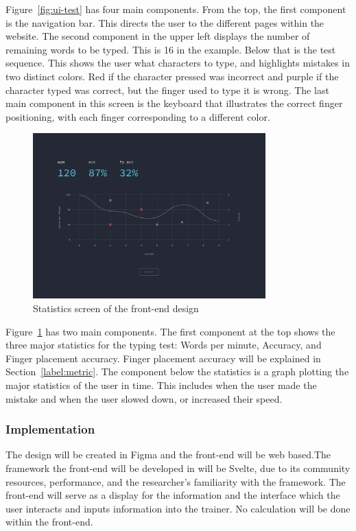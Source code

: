 \documentclass{report}
\begin{document}
Figure~\ref{fig:ui-test} has four main components. From the top, the first
component is the navigation bar. This directs the user to the different pages
within the website. The second component in the upper left displays the number
of remaining words to be typed. This is 16 in the example. Below that is the
test sequence. This shows the user what characters to type, and highlights
mistakes in two distinct colors. Red if the character pressed was incorrect and
purple if the character typed was correct, but the finger used to type it is
wrong. The last main component in this screen is the keyboard that illustrates
the correct finger positioning, with each finger corresponding to a different
color.

\begin{figure}[H]
	\centering
	\includegraphics[width=0.8\textwidth]{ui-stats.png}
	\caption{Statistics screen of the front-end design}
	\label{fig:ui-stat}
	\centering
\end{figure}

Figure~\ref{fig:ui-stat} has two main components. The first component at the top
shows the three major statistics for the typing test: Words per minute,
Accuracy, and Finger placement accuracy. Finger placement accuracy will be
explained in Section~\ref{label:metric}. The component below the statistics is a
graph plotting the major statistics of the user in time. This includes when the
user made the mistake and when the user slowed down, or increased their speed.

\subsubsection{Implementation}
The design will be created in Figma and the front-end will be web based.The
framework the front-end will be developed in will be Svelte, due to its
community resources, performance, and the researcher's familiarity with the
framework. The front-end will serve as a display for the information and the
interface which the user interacts and inputs information into the trainer. No
calculation will be done within the front-end.
\end{document}

